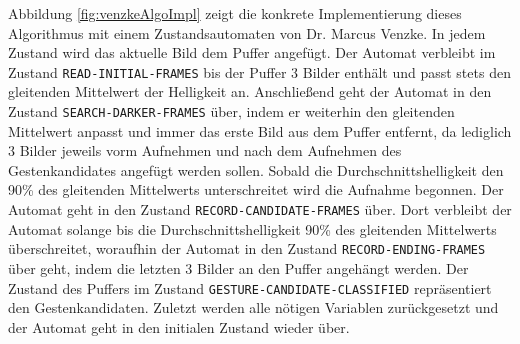 Abbildung \ref{fig:venzkeAlgoImpl} zeigt die konkrete Implementierung dieses Algorithmus mit einem Zustandsautomaten von Dr. Marcus Venzke. In jedem Zustand wird das aktuelle Bild dem Puffer angefügt. Der Automat
verbleibt im Zustand \texttt{READ-INITIAL-FRAMES} bis der Puffer 3 Bilder enthält und passt stets den gleitenden Mittelwert der Helligkeit an. Anschließend geht der Automat in den Zustand
\texttt{SEARCH-DARKER-FRAMES} über, indem er weiterhin den gleitenden Mittelwert anpasst und immer das erste Bild aus dem Puffer entfernt, da lediglich 3 Bilder jeweils vorm Aufnehmen und nach dem Aufnehmen des
Gestenkandidates angefügt werden sollen. Sobald die Durchschnittshelligkeit den 90\% des gleitenden Mittelwerts unterschreitet wird die Aufnahme begonnen. Der Automat geht in den Zustand \texttt{RECORD-CANDIDATE-FRAMES}
über. Dort verbleibt der Automat solange bis die Durchschnittshelligkeit 90\% des gleitenden Mittelwerts überschreitet, woraufhin der Automat in den Zustand \texttt{RECORD-ENDING-FRAMES} über geht, indem die letzten 3
Bilder an den Puffer angehängt werden. Der Zustand des Puffers im Zustand \texttt{GESTURE-CANDIDATE-CLASSIFIED} repräsentiert den Gestenkandidaten. Zuletzt werden alle nötigen Variablen zurückgesetzt und der
Automat geht in den initialen Zustand wieder über.